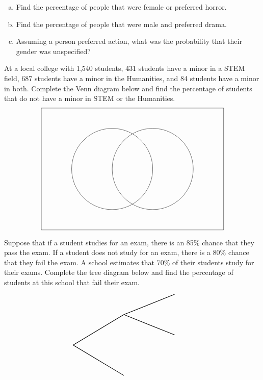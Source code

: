 \documentclass[12pt,letterpaper]{exam}
\begin{document}
\begin{questions}
\begin{enumerate}[(a)]
\item Find the percentage of people that were female or preferred horror. 
\item Find the percentage of people that were male and preferred drama.
\item Assuming a person preferred action, what was the probability that their gender was unspecified? 
\end{enumerate}



\newpage
\question[10] At a local college with 1,540 students, 431 students have a minor in a STEM field, 687 students have a minor in the Humanities, and 84 students have a minor in both. Complete the Venn diagram below and find the percentage of students that do not have a minor in STEM or the Humanities. 
	\[
	\begin{tikzpicture}
	\draw (0,0) rectangle (9,6);
	\draw (3.5,3) circle (2);
	\draw (5.5,3) circle (2);
	
	\node at (3.2,5.3) {};
	\node at (5.7,5.3) {}; 
	
	\node at (2.5,3) {};
	\node at (4.5,3) {};
	\node at (6.5,3) {};
	\node at (8,1) {};
	\end{tikzpicture}
	\]



\newpage
\question[10] Suppose that if a student studies for an exam, there is an 85\% chance that they pass the exam. If a student does not study for an exam, there is a 80\% chance that they fail the exam. A school estimates that 70\% of their students study for their exams. Complete the tree diagram below and find the percentage of students at this school that fail their exam. 
		\[
		\begin{tikzpicture}[scale= 1.0]
		\def\FirstUpLabel{}
		\def\FirstDownLabel{}
		\def\SecondUpLabel{$$}
		\def\SecondDownLabel{$$}
		\def\Up{$$}
		\def\Down{$$}
		\def\UpUp{$$}
		\def\UpDown{$$}
		\def\DownUp{$$}
		\def\DownDown{$$}
		\def\first{$$}
		\def\second{$$}
		\def\third{$$}
		\def\fourth{$$}
		
		\node at (1,1) {\FirstUpLabel};	
		\node at (1,-1) {\FirstDownLabel};	
		\node at (1.8,0.6) {\Up};
		\node at (1.8,-0.6) {\Down};
		\draw[thick] (0,0) -- (2.5,1.5);
		\draw[thick] (0,0) -- (2.5,-1.5);
		
		\node at (3.75,2.3) {\SecondUpLabel};
		\node at (3.75,0.7) {\SecondDownLabel};
		\node at (4,1.8) {\UpUp};
		\node at (4.1,1.2) {\UpDown};
		\node at (5.75,2.5) {\first};
		\node at (5.75,0.5) {\second};
		\draw[thick] (2.5,1.5) -- (5,2.5);
		\draw[thick] (2.5,1.5) -- (5,0.5);


\end{tikzpicture}\]
\end{questions}
\end{document}

